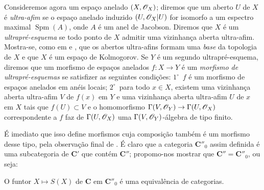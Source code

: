 
\begin{env}[10.9.5]
\label{IV.10.9.5}
Consideremos agora um espaço anelado $(X,\mathscr{O}_X)$; diremos que um aberto $U$ de $X$ é \emph{ultra-afim} se o espaço anelado induzido $(U,\mathscr{O}_X|U)$ for isomorfo a um espectro maximal $\operatorname{Spm}(A)$, onde $A$ é um anel de Jacobson.
Diremos que $X$ é um \emph{ultrapré-esquema} se todo ponto de $X$ admitir uma vizinhança aberta ultra-afim.
Mostra-se, como em  e , que os abertos ultra-afins formam uma \emph{base} da topologia de $X$ e que $X$ é um espaço de Kolmogorov.
Se $Y$ é um segundo ultrapré-esquema, diremos que um morfismo de espaços anelados $f:X\to Y$ é um \emph{morfismo de ultrapré-esquemas} se satisfizer as seguintes condições: $1^\circ$~$f$ é um morfismo de espaços anelados em anéis locais; $2^\circ$~para todo $x\in X$, existem uma vizinhança aberta ultra-afim $V$ de $f(x)$ em $Y$ e uma vizinhança aberta ultra-afim $U$ de $x$ em $X$ tais que $f(U)\subset V$ e o homomorfismo $\Gamma(V,\sh{O}_Y)\to\Gamma(U,\sh{O}_X)$ correspondente a $f$ faz de $\Gamma(U,\mathscr{O}_X)$ uma $\Gamma(V,\mathscr{O}_Y)$-álgebra de tipo finito.

É imediato que isso define morfismos cuja composição também é um morfismo desse tipo, pela observação final de .
É claro que a categoria $\mathbf{C}''_0$ assim definida é uma subcategoria de $\mathbf{C}'$ que contém $\mathbf{C}''$; propomo-nos mostrar que $\mathbf{C}''=\mathbf{C}''_0$, ou seja:
\end{env}

\begin{proposition}[10.9.6]
\label{IV.10.9.6}
O funtor $X\mapsto S(X)$ de $\mathbf{C}$ em $\mathbf{C}''_0$ é uma equivalência de categorias.
\end{proposition}

